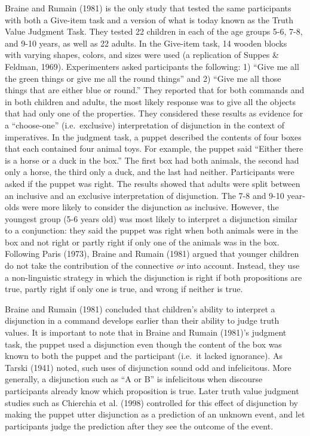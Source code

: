\documentclass[floatsintext,man]{apa6}
\theoremstyle{definition}
\theoremstyle{definition}
\theoremstyle{definition}
\theoremstyle{remark}
\begin{document}
Braine and Rumain (1981) is the only study that tested the same
participants with both a Give-item task and a version of what is today
known as the Truth Value Judgment Task. They tested 22 children in each
of the age groups 5-6, 7-8, and 9-10 years, as well as 22 adults. In the
Give-item task, 14 wooden blocks with varying shapes, colors, and sizes
were used (a replication of Suppes \& Feldman, 1969). Experimenters
asked participants the following: 1) \enquote{Give me all the green
things or give me all the round things} and 2) \enquote{Give me all
those things that are either blue or round.} They reported that for both
commands and in both children and adults, the most likely response was
to give all the objects that had only one of the properties. They
considered these results as evidence for a \enquote{choose-one}
(i.e.~exclusive) interpretation of disjunction in the context of
imperatives. In the judgment task, a puppet described the contents of
four boxes that each contained four animal toys. For example, the puppet
said \enquote{Either there is a horse or a duck in the box.} The first
box had both animals, the second had only a horse, the third only a
duck, and the last had neither. Participants were asked if the puppet
was right. The results showed that adults were split between an
inclusive and an exclusive interpretation of disjunction. The 7-8 and
9-10 year-olds were more likely to consider the disjunction as
inclusive. However, the youngest group (5-6 years old) was most likely
to interpret a disjunction similar to a conjunction: they said the
puppet was right when both animals were in the box and not right or
partly right if only one of the animals was in the box. Following Paris
(1973), Braine and Rumain (1981) argued that younger children do not
take the contribution of the connective \emph{or} into account. Instead,
they use a non-linguistic strategy in which the disjunction is right if
both propositions are true, partly right if only one is true, and wrong
if neither is true.

Braine and Rumain (1981) concluded that children's ability to interpret
a disjunction in a command develops earlier than their ability to judge
truth values. It is important to note that in Braine and Rumain (1981)'s
judgment task, the puppet used a disjunction even though the content of
the box was known to both the puppet and the participant (i.e.~it lacked
ignorance). As Tarski (1941) noted, such uses of disjunction sound odd
and infelicitous. More generally, a disjunction such as \enquote{A or B}
is infelicitous when discourse participants already know which
proposition is true. Later truth value judgment studies such as
Chierchia et al. (1998) controlled for this effect of disjunction by
making the puppet utter disjunction as a prediction of an unknown event,
and let participants judge the prediction after they see the outcome of
the event.
\end{document}
